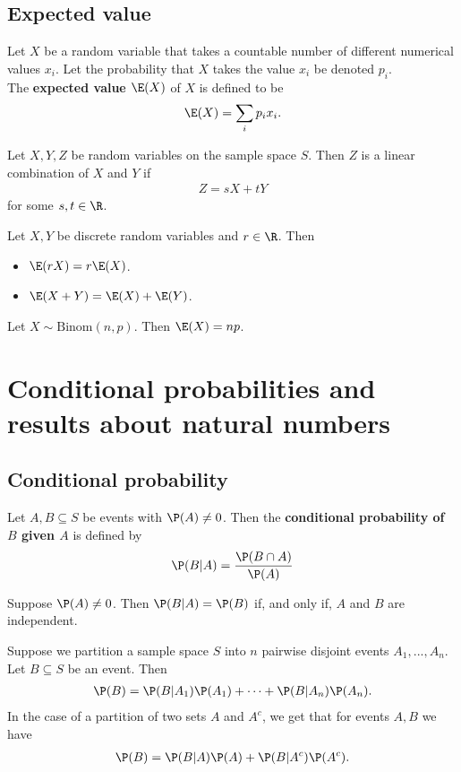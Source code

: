 \documentclass{article}
\begin{document}
\subsection{Expected value}
\begin{definition}
	Let $X$ be a random variable that takes a countable number of different
	numerical values $x_i$. Let the probability that $X$ takes the value $x_i$
	be denoted $p_i$.\\
	The \textbf{expected value $\E(X)$} of $X$ is defined to be
	\begin{align*}
		\E(X) = \sum_i p_i x_i.
	\end{align*}
\end{definition}
\begin{definition}
	Let $X,Y,Z$ be random variables on the sample space $S$.
	Then $Z$ is a linear combination of $X$ and $Y$ if
	\begin{align*}
		Z = sX + tY
	\end{align*}
	for some $s,t\in\R$.
\end{definition}
\begin{theorem}
	Let $X,Y$ be discrete random variables and $r\in\R$. Then
	\begin{itemize}
		\item $\E(rX)=r\E(X)$.
		\item $\E(X + Y) = \E(X) + \E(Y)$.
	\end{itemize}
\end{theorem}
\begin{proposition}
	Let $X\sim\text{Binom}(n,p)$. Then $\E(X)=np$.
\end{proposition}
\section{Conditional probabilities and results about natural numbers}
\subsection{Conditional probability}
\begin{definition}
	Let $A,B\subseteq S$ be events with $\P(A)\not=0$. Then the
	\textbf{conditional probability of $B$ given $A$} is defined by
	\begin{align*}
		\P(B|A) = \frac{\P(B\cap A)}{\P(A)}
	\end{align*}
\end{definition}
\begin{theorem}
	Suppose $\P(A)\not= 0$. Then $\P(B|A)=\P(B)$ if, and only if, $A$ and $B$ are independent.
\end{theorem}
\begin{theorem}
	Suppose we partition a sample space $S$ into $n$ pairwise disjoint events $A_1, ..., A_n$.
	Let $B\subseteq S$ be an event. Then
	\begin{align*}
		\P(B)=\P(B|A_1)\P(A_1)+ \cdots + \P(B|A_n)\P(A_n).
	\end{align*}
	In the case of a partition of two sets $A$ and $A^c$, we get that for events $A,B$ we have
	\begin{align*}
		\P(B) = \P(B|A)\P(A)+\P(B|A^c)\P(A^c).
	\end{align*}
\end{theorem}
\end{document}
